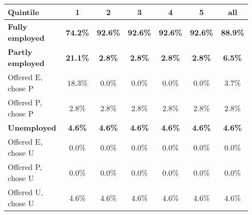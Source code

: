 \begin{center}
\begin{adjustbox}{width=\textwidth}
\begin{tabular}{lcccccc}\toprule
Quintile & 1 & 2 & 3 & 4 & 5 & all \\
\midrule
\textbf{Fully employed} & \textbf{74.2\%} & \textbf{92.6\%} & \textbf{92.6\%} & \textbf{92.6\%} & \textbf{92.6\%} & \textbf{88.9\%} \\
\textbf{Partly employed} & \textbf{21.1\%} & \textbf{2.8\%} & \textbf{2.8\%} & \textbf{2.8\%} & \textbf{2.8\%} & \textbf{6.5\%} \\
\;\;Offered E, chose P & 18.3\% & 0.0\% & 0.0\% & 0.0\% & 0.0\% & 3.7\% \\
\;\;Offered P, chose P & 2.8\% & 2.8\% & 2.8\% & 2.8\% & 2.8\% & 2.8\% \\
\textbf{Unemployed} & \textbf{4.6\%} & \textbf{4.6\%} & \textbf{4.6\%} & \textbf{4.6\%} & \textbf{4.6\%} & \textbf{4.6\%} \\
\;\;Offered E, chose U & 0.0\% & 0.0\% & 0.0\% & 0.0\% & 0.0\% & 0.0\% \\
\;\;Offered P, chose U & 0.0\% & 0.0\% & 0.0\% & 0.0\% & 0.0\% & 0.0\% \\
\;\;Offered U, chose U & 4.6\% & 4.6\% & 4.6\% & 4.6\% & 4.6\% & 4.6\% \\
\bottomrule\end{tabular}
\end{adjustbox}
\end{center}